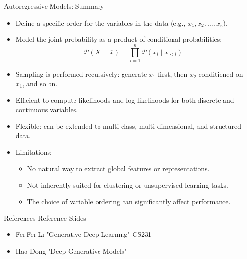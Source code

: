 \begin{frame}[allowframebreaks]{Autoregressive Models: Summary}
    \begin{itemize}
        \item Define a specific order for the variables in the data (e.g., $x_1, x_2, \ldots, x_n$).
        \item Model the joint probability as a product of conditional probabilities: 
        \[
            \mathcal{P}(X = \overline{x}) = \prod_{i=1}^n \mathcal{P}(x_i \mid x_{<i})
        \]
        \item Sampling is performed recursively: generate $x_1$ first, then $x_2$ conditioned on $x_1$, and so on.
        \item Efficient to compute likelihoods and log-likelihoods for both discrete and continuous variables.
        \item Flexible: can be extended to multi-class, multi-dimensional, and structured data.
        \framebreak
        \item Limitations:
        \begin{itemize}
            \item No natural way to extract global features or representations.
            \item Not inherently suited for clustering or unsupervised learning tasks.
            \item The choice of variable ordering can significantly affect performance.
        \end{itemize}
    \end{itemize}
\end{frame}

\begin{frame}{References}
Reference Slides
\begin{itemize}
    \item Fei-Fei Li "Generative Deep Learning" CS231
    \item Hao Dong "Deep Generative Models"
\end{itemize}
    
\end{frame}